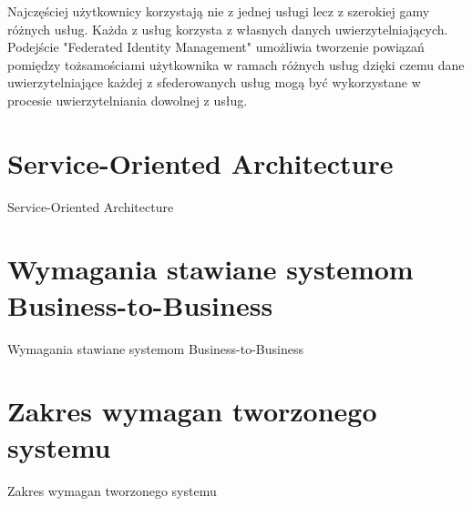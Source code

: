 Najczęściej użytkownicy korzystają nie z jednej usługi lecz z szerokiej gamy różnych usług. Każda z usług korzysta z własnych danych uwierzytelniających. Podejście "Federated Identity Management" umożliwia tworzenie powiązań pomiędzy tożsamościami użytkownika w ramach różnych usług dzięki czemu dane uwierzytelniające każdej z sfederowanych usług mogą być wykorzystane w procesie uwierzytelniania dowolnej z usług.



\section{Service-Oriented Architecture}
\label{sec:soa}

Service-Oriented Architecture


\section{Wymagania stawiane systemom Business-to-Business}
\label{sec:wymaganiaB2B}

Wymagania stawiane systemom Business-to-Business


\section{Zakres wymagan tworzonego systemu}
\label{sec:zakresWymagan}

Zakres wymagan tworzonego systemu

